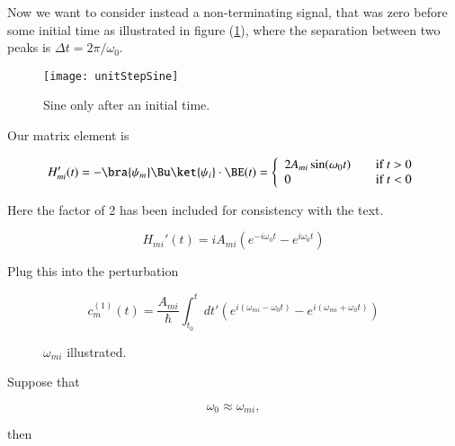 Now we want to consider instead a non-terminating signal, that was zero before some initial time as illustrated in figure (\ref{fig:qmTwoL9:unitStepSine}), where the separation between two peaks is $\Delta t = 2\pi/\omega_0$.

\begin{figure}[htp]
   \centering
   \texttt{[image: unitStepSine]}
   \caption{Sine only after an initial time.}\label{fig:qmTwoL9:unitStepSine}
\end{figure}

Our matrix element is 

\begin{equation}\label{eqn:qmTwoL9:470}
H_{mi}'(t) = - \bra{\psi_m} \Bu \ket{\psi_i} \cdot \BE(t) = 
\left\{
\begin{array}{l l}
2 A_{mi} \sin(\omega_0 t) & \quad \mbox{if $t > 0$} \\
0 & \quad \mbox{if $t < 0$} \\
\end{array}
\right.
\end{equation}

Here the factor of 2 has been included for consistency with the text.

\begin{equation}\label{eqn:qmTwoL9:490}
H_{mi}'(t) = i A_{mi} 
\left( 
e^{-i \omega_0 t}
-e^{i \omega_0 t} 
\right)
\end{equation}

Plug this into the perturbation

\begin{equation}\label{eqn:qmTwoL9:510}
c_m^{(1)}(t) = 
\frac{A_{mi}}{\hbar} \int_{t_0}^t dt' 
\left( 
e^{i (\omega_{mi} - \omega_0 t) }
-e^{i (\omega_{mi} + \omega_0 t) }
\right)
\end{equation}

\begin{figure}[htp]
   \centering
   \def\svgwidth{0.3\columnwidth}
   
   \caption{$\omega_{mi}$ illustrated.}\label{fig:qmTwoL9:6}
\end{figure}

Suppose that

\begin{equation}\label{eqn:qmTwoL9:530}
\omega_0 \approx \omega_{mi},
\end{equation}

then

